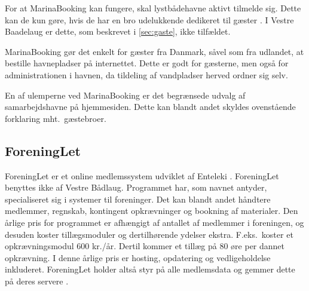 For at MarinaBooking kan fungere, skal lystbådehavne aktivt tilmelde sig. Dette kan de kun gøre, hvis de har en bro udelukkende dedikeret til gæster \cite{int_vb_sl}. I Vestre Baadelaug er dette, som beskrevet i \cref{sec:gaste}, ikke tilfældet.

MarinaBooking gør det enkelt for gæster fra Danmark, såvel som fra udlandet, at bestille havnepladser på internettet. Dette er godt for gæsterne, men også for administrationen i havnen, da tildeling af vandpladser herved ordner sig selv.

En af ulemperne ved MarinaBooking er det begrænsede udvalg af samarbejdshavne på hjemmesiden. Dette kan blandt andet skyldes ovenstående forklaring mht.\ gæstebroer.








\subsection{ForeningLet} %
\label{sub:ForeningLet}

ForeningLet er et online medlemssystem udviklet af Enteleki \cite{foreninglet}. ForeningLet benyttes ikke af Vestre Bådlaug. Programmet har, som navnet antyder, specialiseret sig i systemer til foreninger. Det kan blandt andet håndtere medlemmer, regnskab, kontingent opkrævninger og bookning af materialer. Den årlige pris for programmet er afhængigt af antallet af medlemmer i foreningen, og desuden koster tillægsmoduler og dertilhørende ydelser ekstra. F.eks.\ koster et opkrævningsmodul 600 kr./år. Dertil kommer et tillæg på 80 øre per dannet opkrævning. I denne årlige pris er hosting, opdatering og vedligeholdelse inkluderet. ForeningLet holder altså styr på alle medlemsdata og gemmer dette på deres servere \cite{foreninglet}.

